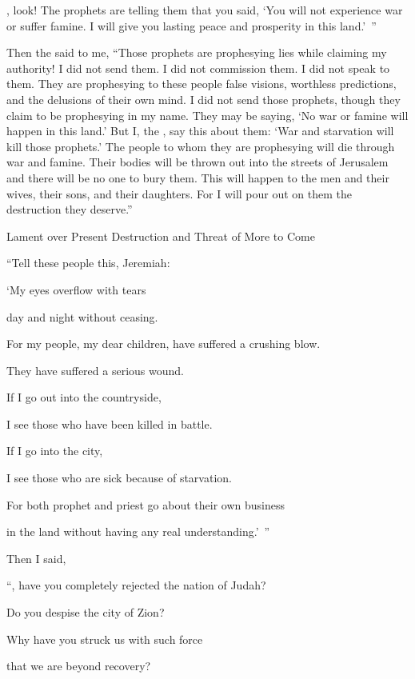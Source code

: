 {{}, look! The prophets
are telling them that you said, ‘You will not
experience
war
or
suffer
famine.
I will give
you lasting
peace
and prosperity in
this land.’ ”
\par }{\PP {}Then the
{}
said
to
me, “Those prophets
are prophesying
lies
while claiming my authority! I did not
send
them. I did not
commission
them. I did not
speak
to them. They
are prophesying
to
these people false
visions,
worthless predictions,
and the delusions
of their own mind.
I
did not
send
those
prophets,
though they
claim to be prophesying
in my name.
They
may be saying,
‘No
war
or famine
will happen
in this land.’
But I,
the {}, say
this
about them: ‘War
and starvation
will kill those
prophets.’
The people
to whom
they
are prophesying
will die through war
and famine.
Their
bodies will be
thrown
out into the streets
of Jerusalem
and there will be no
one to bury
them.
This will happen to the men and their
wives,
their sons,
and their daughters.
For I will pour
out on
them the destruction they deserve.”
\par }{\SH Lament over Present Destruction and Threat of More to Come
\par }{\Q {}“Tell
these people this,
Jeremiah:

\par }{\Q ‘My eyes
overflow
with tears
\par }{\Q day
and night
without
ceasing.
\par }{\Q For
my people, my dear children,
have suffered
a crushing
blow.
\par }{\Q They have suffered
a serious
wound.
\par }{\Q {}If
I go out
into the countryside,
\par }{\Q I see
those who have been killed
in battle.
\par }{\Q If
I go
into the city,
\par }{\Q I see
those who are sick
because of starvation.
\par }{\Q For
both
prophet
and priest
go about their own business
\par }{\Q in the land
without
having any real understanding.’ ”
\par }{\PP {}Then I
said,
\par }{\Q “{}, have you completely rejected
the nation of Judah?
\par }{\Q Do you despise the city
of Zion?
\par }{\Q Why
have you struck
us with such force
\par }{\Q that we are beyond recovery?

}
